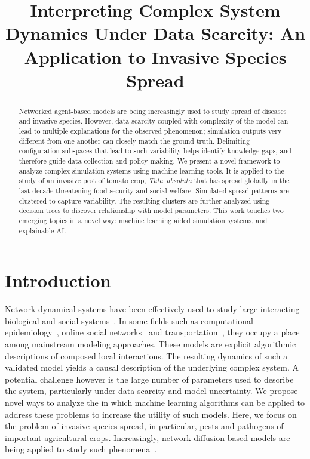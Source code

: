 \documentclass{article}
\title{Interpreting Complex System Dynamics Under Data Scarcity: An
Application to Invasive Species Spread}
\begin{document}
\maketitle

\begin{abstract}
Networked agent-based models are being increasingly used to study spread of
diseases and invasive species. However, data scarcity coupled with
complexity of the model can lead to multiple explanations for the observed
phenomenon; simulation outputs very different from one another can closely
match the ground truth. Delimiting configuration subspaces that lead to
such variability helps identify knowledge gaps, and therefore guide data
collection and policy making. We present a novel framework to analyze
complex simulation systems using machine learning tools. It is applied to
the study of an invasive pest of tomato crop, \emph{Tuta~absoluta} that has
spread globally in the last decade threatening food security and social
welfare. Simulated spread patterns are clustered to capture variability.
The resulting clusters are further analyzed using decision trees to
discover relationship with model parameters. This work touches two emerging
topics in a novel way: machine learning aided simulation systems, and
explainable AI.
\end{abstract}

\section{Introduction}
Network dynamical systems have been effectively used to study large
interacting biological and social systems~\cite{adiga2018graphical}. In
some fields such as computational epidemiology~\cite{eubank2004modelling},
online social networks~\cite{guille2013information} and
transportation~\cite{transims}, they occupy a place among mainstream
modeling approaches.  These models are explicit algorithmic descriptions of
composed local interactions. The resulting dynamics of such a validated
model yields a causal description of the underlying complex system. A
potential challenge however is the large number of parameters used to
describe the system, particularly under data scarcity and model
uncertainty.  We propose novel ways to analyze the in which machine
learning algorithms can be applied to address these problems to increase
the utility of such models.  Here, we focus on the problem of invasive
species spread, in particular, pests and pathogens of important
agricultural crops.  Increasingly, network diffusion based models are being
applied to study such
phenomena~\cite{carrasco2010unveiling,nopsa2015ecological}.
\end{document}
